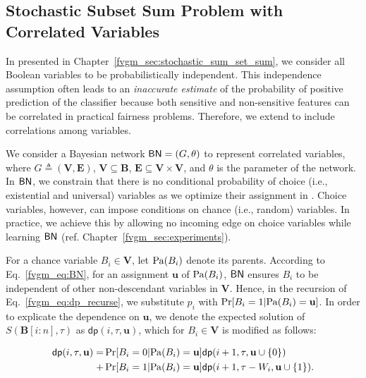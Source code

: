 	
\subsection{Stochastic Subset Sum Problem with Correlated Variables} 
\label{fvgm_sec:dp_with_BN}
In {\stochastic} presented in Chapter~\ref{fvgm_sec:stochastic_sum_set_sum}, we consider all  Boolean variables to be probabilistically independent. This independence assumption often leads to an \textit{inaccurate estimate} of the probability of positive prediction of the classifier because both sensitive and non-sensitive features can be correlated in practical fairness problems. Therefore, we extend {\stochastic} to include correlations among variables.

We consider a Bayesian network $ \mathsf{BN} = (G, \theta) $ to represent correlated variables, where $ G \triangleq (\mathbf{V}, \mathbf{E}) $, $ \mathbf{V} \subseteq \mathbf{B} $, $ \mathbf{E} \subseteq \mathbf{V} \times \mathbf{V}  $, and $ \theta $ is the parameter of the network.  In  $ \mathsf{BN} $, we constrain that there is no conditional probability of choice (i.e., existential and universal) variables as we optimize their assignment in {\stochastic}. Choice variables, however, can impose conditions on chance (i.e., random) variables. In practice, we achieve this by allowing no incoming edge on choice variables while learning $ \mathsf{BN} $ (ref. Chapter~\ref{fvgm_sec:experiments}).
   	
   	

For a chance variable $ B_i \in \mathbf{V} $, let $ \mathrm{Pa}(B_i) $ denote its parents. According to Eq.~\eqref{fvgm_eq:BN},  for an assignment $ \mathbf{u} $ of $ \mathrm{Pa}(B_i) $, $ \mathsf{BN} $ ensures $ B_i $ to be independent of other non-descendant variables in $ \mathbf{V} $. Hence, in the recursion of Eq.~\eqref{fvgm_eq:dp_recurse}, we substitute  $ p_i $  with  $ \Pr[B_i = 1| \mathrm{Pa}(B_i) = \mathbf{u}] $. In order to explicate the dependence on $ \mathbf{u} $, we denote the expected solution of $ S(\mathbf{B}[i:n], \tau) $ as 
$ \mathsf{dp}(i, \tau, \mathbf{u}) $, which for $ B_i \in \mathbf{V} $ is modified as follows:

\begin{align*}
	\mathsf{dp}(i,  \tau, \mathbf{u}) = & \Pr[B_i = 0| \mathrm{Pa}(B_i) = \mathbf{u}] \mathsf{dp}(i+1, \tau, \mathbf{u} \cup \{0\})  \\
	 + & \Pr[B_i = 1| \mathrm{Pa}(B_i) = \mathbf{u}]  \mathsf{dp}(i+1, \tau-W_i, \mathbf{u} \cup \{1\}).
\end{align*}


